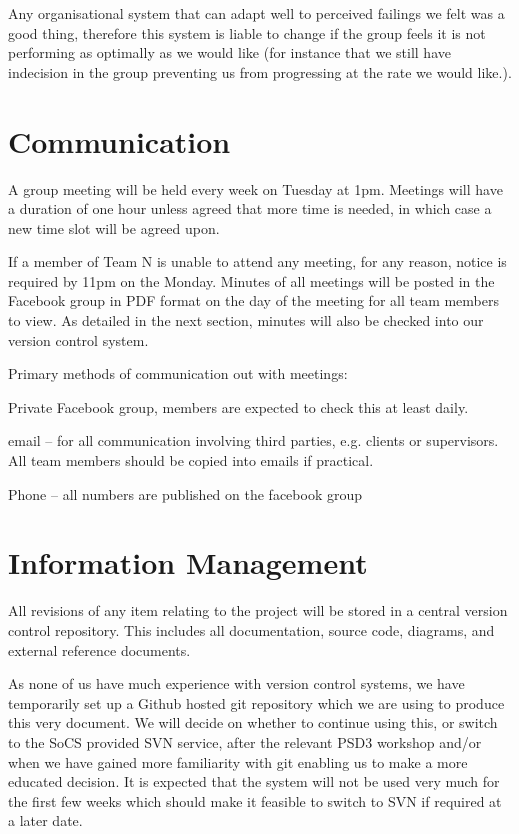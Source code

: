 \documentclass{l3deliverable}
\begin{document}
Any organisational system that can adapt well to perceived failings we felt was a good thing, therefore this system is liable to change if the group feels it is not performing as optimally as we would like (for instance that we still have indecision in the group preventing us from progressing at the rate we would like.).


\section{Communication}

A group meeting will be held every week on Tuesday at 1pm. Meetings will have a duration of one hour unless agreed that more time is needed, in which case a new time slot will be agreed upon.

If a member of Team N is unable to attend any meeting, for any reason, notice is required by 11pm on the Monday. Minutes of all meetings will be posted in the Facebook group in PDF format on the day of the meeting for all team members to view. As detailed in the next section, minutes will also be checked into our version control system.

Primary methods of communication out with meetings:
\begin{list}{}{}
\item Private Facebook group, members are expected to check this at least daily.
\item email -- for all communication involving third parties, e.g. clients or supervisors. All team members should be copied into emails if practical.
\item Phone -- all numbers are published on the facebook group
\end{list}


\section{Information Management}

All revisions of any item relating to the project will be stored in a central version control repository. This includes all documentation, source code, diagrams, and external reference documents.

As none of us have much experience with version control systems, we have temporarily set up a Github hosted git repository which we are using to produce this very document. We will decide on whether to continue using this, or switch to the SoCS provided SVN service, after the relevant PSD3 workshop and/or when we have gained more familiarity with git enabling us to make a more educated decision. It is expected that the system will not be used very much for the first few weeks which should make it feasible to switch to SVN if required at a later date.
\end{document}
